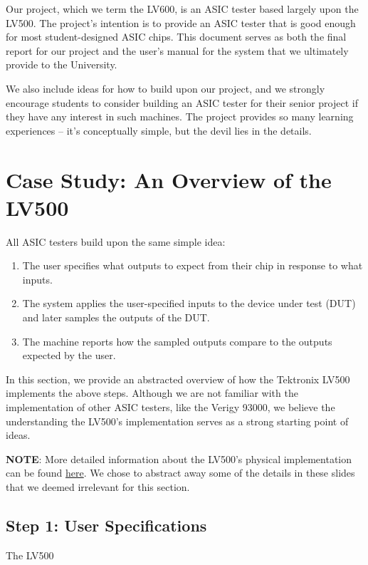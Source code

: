 \documentclass[letterpaper, 10 pt]{report}
\begin{document}
Our project, which we term the LV600, is an ASIC tester based largely upon the LV500. The project's intention is to provide an ASIC tester that is good enough for most student-designed ASIC chips. This document serves as both the final report for our project and the user's manual for the system that we ultimately provide to the University. 

We also include ideas for how to build upon our project, and we strongly encourage students to consider building an ASIC tester for their senior project if they have any interest in such machines. The project provides so many learning experiences -- it's conceptually simple, but the devil lies in the details. 

\newpage

\section{Case Study: An Overview of the LV500}
All ASIC testers build upon the same simple idea: 
\begin{enumerate}
\item The user specifies what outputs to expect from their chip in response to what inputs.
\item The system applies the user-specified inputs to the device under test (DUT) and later samples the outputs of the DUT.
\item The machine reports how the sampled outputs compare to the outputs expected by the user.
\end{enumerate}

In this section, we provide an abstracted overview of how the Tektronix LV500 implements the above steps. Although we are not familiar with the implementation of other ASIC testers, like the Verigy 93000, we believe the understanding the LV500's implementation serves as a strong starting point of ideas. 

\textbf{NOTE}: More detailed information about the LV500's physical implementation can be found \href{https://view.officeapps.live.com/op/view.aspx?src=http://www.ece.utah.edu/~kstevens/6712/tester.ppt}{here}. We chose to abstract away  some of the details in these slides that we deemed irrelevant for this section.

\subsection{Step 1: User Specifications}
The LV500 
\end{document}

